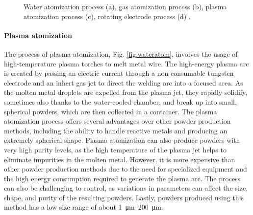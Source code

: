 \begin{figure}
{    }
    \qquad
    \caption[Atomization processes]{Water atomization process (a), gas atomization process (b), plasma atomization process (c), rotating electrode process (d) \cite{material_technology_innovations_co_rotating_nodate, material_technology_innovations_co_water_nodate, material_technology_innovations_co_gas_nodate, inovar_communications_ltd_metal_2020}.}
    \label{fig:atom}
\end{figure}
\paragraph{Plasma atomization} The process of plasma atomization, Fig. \ref{fig:wateratom}, involves the usage of high-temperature plasma torches to melt metal wire. The high-energy plasma arc is created by passing an electric current through a non-consumable tungsten electrode and an inhert gas jet to direct the welding arc into a focused area. As the molten metal droplets are expelled from the plasma jet, they rapidly solidify, sometimes also thanks to the water-cooled chamber, and break up into small, spherical powders, which are then collected in a container. The plasma atomization process offers several advantages over other powder production methods, including the ability to handle reactive metals and producing an extremely spherical shape. Plasma atomization can also produce powders with very high purity levels, as the high temperature of the plasma jet helps to eliminate impurities in the molten metal. However, it is more expensive than other powder production methods due to the need for specialized equipment and the high energy consumption required to generate the plasma arc. The process can also be challenging to control, as variations in parameters can affect the size, shape, and purity of the resulting powders. Lastly, powders produced using this method has a low size range of about \SIrange[range-phrase = --]{1}{200}{\micro\metre}.
